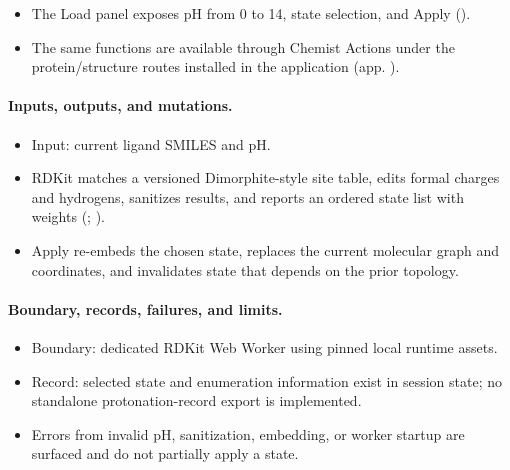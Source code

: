 \documentclass[11pt]{article}
\begin{document}
\begin{small}
\begin{itemize}[leftmargin=*]

\item The Load panel exposes pH from 0 to 14, state selection, and Apply ().

\item The same functions are available through Chemist Actions under the protein/structure routes installed in the application (app. ).

\end{itemize}

\paragraph{Inputs, outputs, and mutations.}

\begin{itemize}[leftmargin=*]

\item Input: current ligand SMILES and pH.

\item RDKit matches a versioned Dimorphite-style site table, edits formal charges and hydrogens, sanitizes results, and reports an ordered state list with weights (; ).

\item Apply re-embeds the chosen state, replaces the current molecular graph and coordinates, and invalidates state that depends on the prior topology.

\end{itemize}

\paragraph{Boundary, records, failures, and limits.}

\begin{itemize}[leftmargin=*]

\item Boundary: dedicated RDKit Web Worker using pinned local runtime assets.

\item Record: selected state and enumeration information exist in session state; no standalone protonation-record export is implemented.

\item Errors from invalid pH, sanitization, embedding, or worker startup are surfaced and do not partially apply a state.


\end{itemize}
\end{small}
\end{document}
